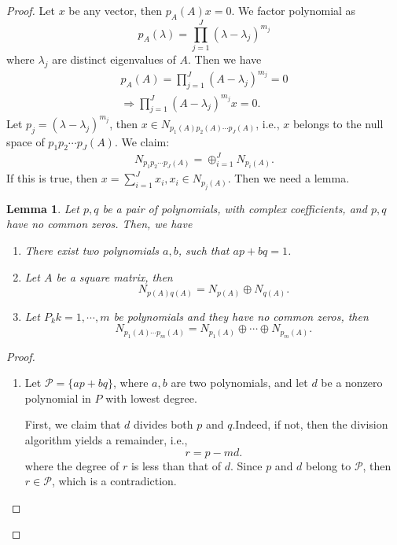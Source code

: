 \documentclass[11pt]{book}
\newtheorem{lemma}[theorem]{Lemma}
\theoremstyle{definition}
\numberwithin{equation}{chapter}
\begin{document}
\begin{proof}
Let $x$ be any vector, then $p_A(A)x = 0$. We factor polynomial as $$p_A(\lambda) = \prod^J_{j=1}\left(\lambda - \lambda_j\right)^{m_j}$$ where $\lambda_j$ are distinct eigenvalues of $A$. Then we have
\begin{align*}
    p_A(A) = \prod^J_{j=1}\left(A - \lambda_j\right)^{m_j} = 0 \\
    \Rightarrow \prod^J_{j=1}\left(A - \lambda_j\right)^{m_j}x = 0.
\end{align*}
Let $p_j = \left(\lambda - \lambda_j\right)^{m_j}$, then $x\in N_{p_1(A)p_2(A)\cdots p_J(A)}$, i.e., $x$ belongs to the null space of $p_1 p_2 \cdots p_J(A)$. We claim: 
\begin{align*}
    N_{p_1p_2\cdots p_J(A)} = \oplus^J_{i=1} N_{p_i(A)}.
\end{align*}
If this is true, then $x = \sum^J_{i=1}x_i, x_i\in N_{p_j(A)}$. Then we need a lemma.

\begin{lemma}
Let $p, q$ be a pair of polynomials, with complex coefficients, and $p,q$ have no common zeros. Then, we have
\begin{enumerate}[label=(\alph*)]
    \item There exist two polynomials $a,b$, such that $ap+bq = 1$.
    \item Let $A$ be a square matrix, then 
    $$N_{p(A)q(A)} = N_{p(A)} \oplus N_{q(A)}.$$
    \item Let $P_k k = 1, \cdots, m$ be polynomials and they have no common zeros, then 
    $$N_{p_1(A)\cdots p_m(A)} = N_{p_1(A)} \oplus\cdots\oplus N_{p_m(A)}.$$
\end{enumerate}
\end{lemma}
\begin{proof}
~\begin{enumerate}[label=(\alph*)]
    \item Let $\mathcal{P} = \{ap+bq\}$, where $a,b$ are two polynomials, and let $d$ be a nonzero polynomial in $P$ with lowest degree. 
    
    First, we claim that $d$ divides both $p$ and $q$.Indeed, if not, then the division algorithm yields a remainder, i.e.,
    $$r = p - md.$$
    where the degree of $r$ is less than that of $d$. Since $p$ and $d$ belong to $\mathcal{P}$, then $r\in \mathcal{P}$, which is a contradiction. 
    

\end{enumerate}
\end{proof}
\end{proof}
\end{document}
